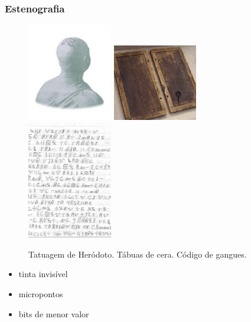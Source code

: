 \begin{frame}[allowframebreaks]
\frametitle{Estenografia}
\begin{figure}[h]
\centering
\includegraphics[width=0.33\textwidth,height=0.7\textheight,keepaspectratio]{figures/herodotus.jpg}
\includegraphics[width=0.33\textwidth,height=0.7\textheight,keepaspectratio]{figures/waxtablet.jpg}
\includegraphics[width=0.33\textwidth,height=0.7\textheight,keepaspectratio]{figures/gangcode.jpg}
\caption{Tatuagem de Heródoto. Tábuas de cera. Código de gangues.}
\label{fig-estenografia}
\end{figure}

\begin{itemize}
\item tinta invisível
\item micropontos
\item bits de menor valor
\end{itemize}
\end{frame}




